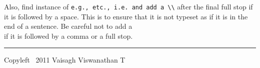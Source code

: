 \documentclass[12pt,landscape]{article}
\begin{document}
Also, find instance of \verb!e.g., etc., i.e. and add a \\! after the final full stop if it is followed by a space. 
This is to ensure that it is not typeset as if it is in the end of a sentence. Be careful not to add a \\ if it is followed by a comma or a full stop.


\rule{0.3\linewidth}{0.25pt}
\scriptsize

Copyleft  \textcopyleft\ 2011 Vaisagh Viswanathan T
\end{document}
